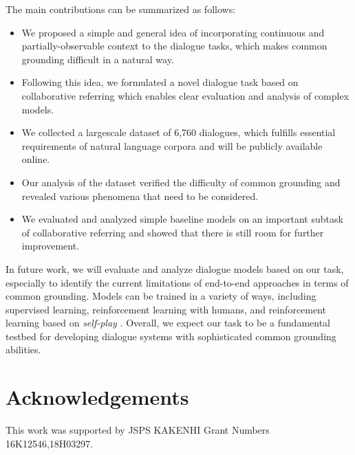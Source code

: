 \documentclass[letterpaper]{article} %
\begin{document}
The main contributions can be summarized as follows:

\begin{itemize}
  \item We proposed a simple and general idea of incorporating continuous and partially-observable context to the dialogue tasks, which makes common grounding difficult in a natural way.
  \item Following this idea, we formulated a novel dialogue task based on collaborative referring which enables clear evaluation and analysis of complex models.
  \item We collected a largescale dataset of 6,760 dialogues, which fulfills essential requirements of natural language corpora and will be publicly available online.
  \item Our analysis of the dataset verified the difficulty of common grounding and revealed various phenomena that need to be considered.
  \item We evaluated and analyzed simple baseline models on an important subtask of collaborative referring and showed that there is still room for further improvement.
\end{itemize}

In future work, we will evaluate and analyze dialogue models based on our task, especially to identify the current limitations of end-to-end approaches in terms of common grounding. Models can be trained in a variety of ways, including supervised learning, reinforcement learning with humans, and reinforcement learning based on \emph{self-play} \cite{lewis2017deal}. Overall, we expect our task to be a fundamental testbed for developing dialogue systems with sophisticated common grounding abilities.

\section*{Acknowledgements}
This work was supported by JSPS KAKENHI Grant Numbers 16K12546,18H03297.

\fontsize{9.5pt}{10.5pt} \selectfont



\end{document}
